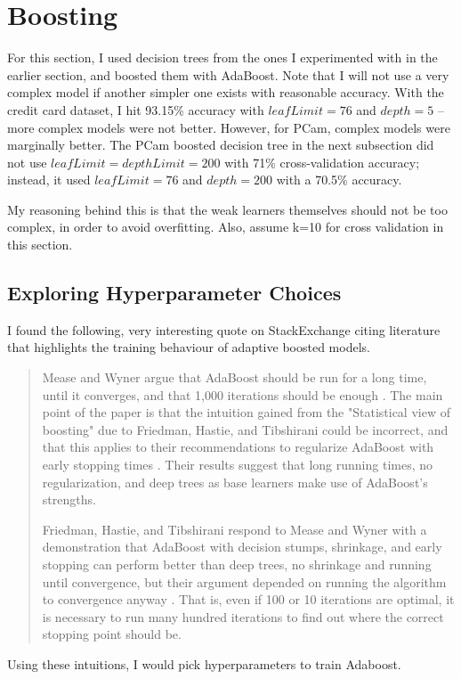 \documentclass[a4paper]{article}
\begin{document}
\section{Boosting}
For this section, I used decision trees from the ones I experimented with in the earlier section, and boosted them with AdaBoost. Note that I will not use a very complex model if another simpler one exists with reasonable accuracy. With the credit card dataset, I hit 93.15\% accuracy with $leafLimit= 76$ and $depth= 5$ -- more complex models were not better. However, for PCam, complex models were marginally better. The PCam boosted decision tree in the next subsection did not use $leafLimit = depthLimit = 200$ with 71\% cross-validation accuracy; instead, it used $leafLimit= 76$ and $depth= 200$ with a 70.5\% accuracy.

My reasoning behind this is that the weak learners themselves should not be too complex, in order to avoid overfitting\autocite{Udacity-Adaboost}. Also, assume k=10 for cross validation in this section. 
\subsection{Exploring Hyperparameter Choices}
I found the following, very interesting quote on StackExchange citing literature that highlights the training behaviour of adaptive boosted models.
\begin{quote}
Mease and Wyner argue that AdaBoost should be run for a long time, until it converges, and that 1,000 iterations should be enough \autocite{mease2008evidence}. The main point of the paper is that the intuition gained from the "Statistical view of boosting" due to Friedman, Hastie, and Tibshirani could be incorrect, and that this applies to their recommendations to regularize AdaBoost with early stopping times \autocite{hastie01statisticallearning}. Their results suggest that long running times, no regularization, and deep trees as base learners make use of AdaBoost's strengths.

Friedman, Hastie, and Tibshirani respond to Mease and Wyner with a demonstration that AdaBoost with decision stumps, shrinkage, and early stopping can perform better than deep trees, no shrinkage and running until convergence, but their argument depended on running the algorithm to convergence anyway \autocite{hastie01statisticallearning}. That is, even if 100 or 10 iterations are optimal, it is necessary to run many hundred iterations to find out where the correct stopping point should be.\autocite{Stackoverflow-quote}
\end{quote}
Using these intuitions, I would pick hyperparameters to train Adaboost.
\end{document}
